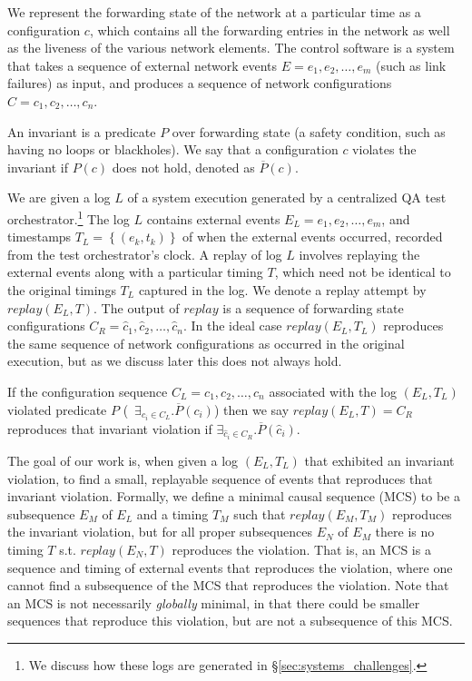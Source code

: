 We represent the forwarding state of the network
at a particular time as a configuration $c$, which contains all the forwarding
entries in the network
as well as the liveness of the various network elements.
The control software is a system %
that takes a sequence of
external network events $E = e_1,e_2,\dots,e_m$ (such as link failures) as input,
and produces a sequence of network configurations
$C = c_1,c_2,\dots,c_n$.%

An invariant is a predicate $P$ over forwarding state (a safety
condition, such as having no loops or blackholes). We say that a configuration
$c$ violates the invariant if $P(c)$ does not
hold, denoted as $\overline{P}(c)$.

We are given a log $L$ of a system execution generated
by a centralized QA test orchestrator.\footnote{We
discuss how these logs are generated in \S\ref{sec:systems_challenges}.}
The log $L$ contains external
events $E_L = e_1,e_2,\dots,e_m$, and
timestamps $T_L = \left\{ (e_k, t_k) \right\}$ of when the external events
occurred, recorded from the test orchestrator's clock.
A replay of log $L$ involves replaying the external events along with a
particular timing $T$,
which need not be identical to the original timings $T_L$ captured in the
log. We
denote a replay attempt by $replay(E_L,T)$.
The output of $replay$ is a sequence of forwarding state configurations
$C_R = \hat{c}_1,\hat{c}_2,\dots,\hat{c}_n$. In the ideal case $replay(E_L,T_L)$ reproduces the same
sequence of network configurations as occurred in the original execution, but as we discuss later
this does not always hold.

If the configuration sequence $C_L = c_1,c_2,\dots,c_n$ associated with the log $(E_L, T_L)$ violated predicate $P$
(\ie~$\exists_{c_i \in C_L}. \overline{P}(c_i)$)
then we say $replay(E_L,T) = C_R$ reproduces that invariant violation if
$\exists_{\hat{c}_i \in C_R}. \overline{P}(\hat{c}_i)$.

The goal of our work is, when given a log $(E_L, T_L)$ that exhibited an
invariant violation, to find a small, replayable sequence of events that reproduces that
invariant violation. Formally, we define a minimal causal sequence (MCS)
to be a subsequence $E_M$
of $E_L$ and a timing $T_M$ such
that $replay(E_M,T_M)$ reproduces the invariant violation, but for all proper
subsequences $E_N$ of $E_M$
there is no timing $T$ s.t. $replay(E_N,T)$ reproduces the violation.
That is, an MCS is a sequence and timing of external events that reproduces the violation,
where one cannot find a subsequence of the MCS that reproduces the violation.
Note that an MCS is not necessarily {\em globally} minimal, in that there could be smaller
sequences that reproduce this violation, but are not a subsequence of this MCS.

